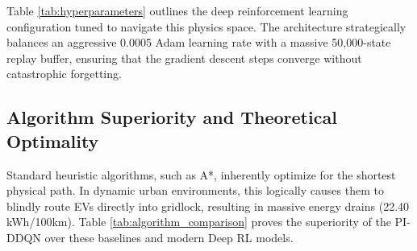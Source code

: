 \documentclass[journal, a4paper, twocolumn]{IEEEtran}
\begin{document}
\begin{table}[htbp]
\centering
\caption{Hyperparameters of the Proposed Strategy}
\label{tab:hyperparameters}
\end{table}

Table \ref{tab:hyperparameters} outlines the deep reinforcement learning configuration tuned to navigate this physics space. The architecture strategically balances an aggressive 0.0005 Adam learning rate with a massive 50,000-state replay buffer, ensuring that the gradient descent steps converge without catastrophic forgetting.

\subsection{Algorithm Superiority and Theoretical Optimality}
Standard heuristic algorithms, such as A*, inherently optimize for the shortest physical path. In dynamic urban environments, this logically causes them to blindly route EVs directly into gridlock, resulting in massive energy drains (22.40 kWh/100km). Table \ref{tab:algorithm_comparison} proves the superiority of the PI-DDQN over these baselines and modern Deep RL models. 
\end{document}
